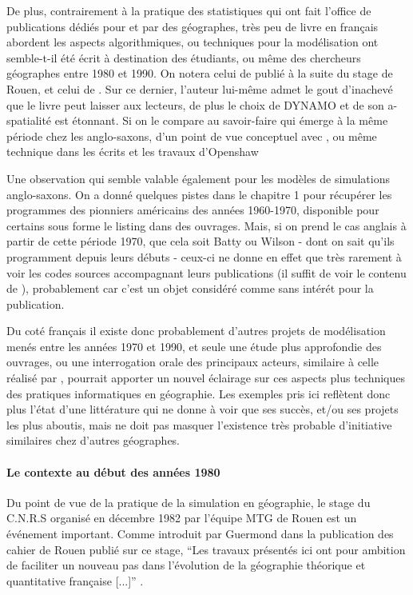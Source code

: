 De plus, contrairement à la pratique des statistiques qui ont fait l'office de publications dédiés pour et par des géographes, très peu de livre en français abordent les aspects algorithmiques, ou techniques pour la modélisation ont semble-t-il été écrit à destination des étudiants, ou même des chercheurs géographes entre 1980 et 1990. On notera celui de \textcite{Guermond1984} publié à la suite du stage de Rouen, et celui de \textcite{Dauphine1987}. Sur ce dernier, l'auteur lui-même admet le gout d'inachevé que le livre peut laisser aux lecteurs, de plus le choix de DYNAMO et de son a-spatialité est étonnant. Si on le compare au savoir-faire qui émerge à la même période chez les anglo-saxons, d'un point de vue conceptuel avec \textcite{Couclelis1985}, ou même technique dans les écrits et les travaux d'Openshaw \textcites{Openshaw1983, Openshaw1988, Openshaw2000}

Une observation qui semble valable également pour les modèles de simulations anglo-saxons. On a donné quelques pistes dans le chapitre 1 pour récupérer les programmes des pionniers américains des années 1960-1970, disponible pour certains sous forme le listing dans des ouvrages. Mais, si on prend le cas anglais à partir de cette période 1970, que cela soit Batty ou Wilson - dont on sait qu'ils programment  depuis leurs débuts - ceux-ci ne donne en effet que très rarement à voir les codes sources accompagnant leurs publications (il suffit de voir le contenu de \autocite{Batty1976}), probablement car c'est un objet considéré comme sans intérét pour la publication.

Du coté français il existe donc probablement d'autres projets de modélisation menés entre les années 1970 et 1990, et seule une étude plus approfondie des ouvrages, ou une interrogation orale des principaux acteurs, similaire à celle réalisé par \textcite{Cuyala2014}, pourrait apporter un nouvel éclairage sur ces aspects plus techniques des pratiques informatiques en géographie. Les exemples pris ici reflètent donc plus l'état d'une littérature qui ne donne à voir que ses succès, et/ou ses projets les plus aboutis, mais ne doit pas masquer l'existence très probable d'initiative similaires chez d'autres géographes.

\paragraph{Le contexte au début des années 1980}

Du point de vue de la pratique de la simulation en géographie, le stage du C.N.R.S organisé en décembre 1982 par l'équipe MTG de Rouen est un événement important. Comme introduit par Guermond dans la publication des cahier de Rouen publié sur ce stage, \enquote{Les travaux présentés ici ont pour ambition de faciliter un nouveau pas dans l'évolution de la géographie théorique et quantitative française [...]} \autocite{Guermond1983}.

